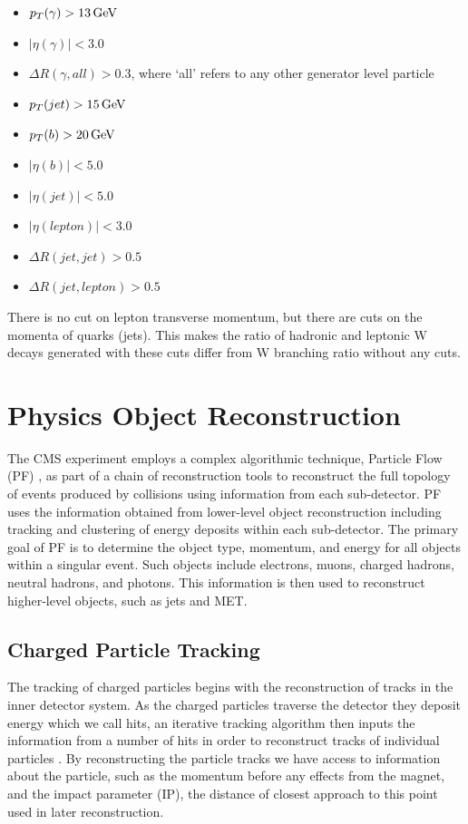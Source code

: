 \begin{itemize}
	\item $p_T (\gamma) > 13 \,\text{Ge\hspace{-.08em}V}$
	\item $|\eta(\gamma)| < 3.0$
	\item $\Delta R (\gamma, all) > 0.3$, where `all' refers to any other generator level particle
	\item $p_T (jet) > 15 \,\text{Ge\hspace{-.08em}V}$
	\item $p_T (b) > 20 \,\text{Ge\hspace{-.08em}V}$
	\item $|\eta (b)| < 5.0$
	\item $|\eta (jet)| < 5.0$
	\item $| \eta (lepton)| < 3.0$
	\item $\Delta R (jet, jet) > 0.5$
	\item $\Delta R (jet, lepton) > 0.5$
\end{itemize}

There is no cut on lepton transverse momentum, but there are cuts on the momenta of quarks (jets). This makes the ratio of hadronic and leptonic W decays generated with these cuts differ from W branching ratio without any cuts.

\section{Physics Object Reconstruction} \label{sec-ParticleObjectReconstruction}

The CMS experiment employs a complex algorithmic technique, Particle Flow (PF) \cite{CMS-PAS-PFT-09-001}, as part of a chain of reconstruction tools to reconstruct the full topology of events produced by collisions using information from each sub-detector. PF uses the information obtained from lower-level object reconstruction including tracking and clustering of energy deposits within each sub-detector. The primary goal of PF is to determine the object type, momentum, and energy for all objects within a singular event. Such objects include electrons, muons,  charged hadrons, neutral hadrons, and photons. This information is then used to reconstruct higher-level objects, such as jets and MET.

\subsection{Charged Particle Tracking} \label{subsec-ChargedParticleTracking}

The tracking of charged particles begins with the reconstruction of tracks in the inner detector system. As the charged particles traverse the detector they deposit energy which we call hits, an iterative tracking algorithm then inputs the information from a number of hits in order to reconstruct tracks of individual particles \cite{1748-0221-9-10-P10009}. By reconstructing the particle tracks we have access to information about the particle, such as the momentum before any effects from the magnet, and the impact parameter (IP), the distance of closest approach to this point used in later reconstruction. 

